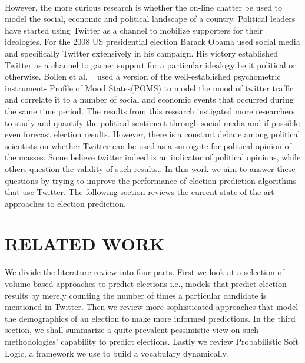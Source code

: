 \paragraph{}
However, the more curious research is whether the on-line chatter be used to model the social, economic and political landscape of a country.
Political leaders have started using Twitter as a channel to mobilize supporters for their ideologies.
For the 2008 US presidential election Barack Obama used social media and specifically Twitter extensively in his campaign. 
His victory established Twitter as a channel to garner support for a particular idealogy be it political or otherwise.
Bollen et al. ~\cite{bollen2011modeling} used a version of the well-established psychometric instrument- Profile of Mood States(POMS) to model the mood of twitter traffic and correlate it to a number of social and economic events that occurred during the same time period. 
The results from this research instigated more researchers to study and quantify the political sentiment through social media and if possible even forecast election results.
However, there is a constant debate among political scientists on whether Twitter can be used as a surrogate for political opinion of the masses.
Some believe twitter indeed is an indicator of political opinions, while others question the validity of such results.. 
In this work we aim to answer these questions by trying to improve the performance of election prediction algorithms that use Twitter.
The following section reviews the current state of the art approaches to election prediction. 

\section{RELATED WORK}
We divide the literature review into four parts.
First we look at a selection of volume based approaches to predict elections i.e., models that predict election results by merely counting the number of times a particular candidate is mentioned in Twitter.
Then we review more sophisticated approaches that model the demographics of an election to make more informed predictions.
In the third section, we shall summarize a quite prevalent pessimistic view on such methodologies' capability to predict elections.
Lastly we review Probabilistic Soft Logic, a framework we use to build a vocabulary dynamically.
